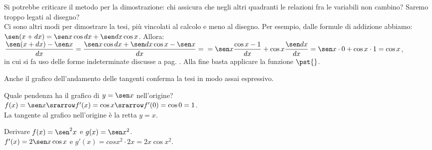 \begin{osservazione}
  Si potrebbe criticare il metodo per la dimostrazione: chi assicura che 
negli
  altri quadranti le relazioni fra le variabili non cambino? Saremo troppo
  legati al disegno?\\
  Ci sono altri modi per dimostrare la tesi, più vincolati al calcolo
  e meno al disegno.  Per esempio, dalle formule di addizione abbiamo:
  $\sen(x+dx)=\sen x \cos dx + \sen dx \cos x$. Allora:\\
  $\dfrac{\sen(x+dx)-\sen x}{dx}=\dfrac{\sen x \cos dx + \sen dx \cos x -
   \sen x}{dx}=\\
  =\sen x \dfrac{\cos x-1}{dx}+ \cos x\dfrac{\sen dx}{dx}=
  \sen x\cdot 0 + \cos x\cdot 1=\cos x$,\\
  in cui si fa uso delle forme indeterminate discusse a pag. 
  \pageref{subsubsec:insnum_fseno}. Alla fine basta applicare la funzione 
  $\pst{}$.
\end{osservazione}

\begin{osservazione}
Anche il grafico dell'andamento delle tangenti conferma la tesi
in modo assai espressivo. \\
\begin{inaccessibleblock}
  \begin{minipage}[]{.47\textwidth}
    \begin{center} \seno \end{center}
 \end{minipage} 
  \hfill
 \begin{minipage}[]{.47\textwidth}
 \begin{center} \tangentiseno \end{center}
 \end{minipage}
\end{inaccessibleblock}
\label{}
\end{osservazione}

\begin{esempio}
Quale pendenza ha il grafico di $y=\sen x$ nell'origine?\\
$f(x)= \sen x \srarrow f'(x)=\cos x\srarrow f'(0)=\cos 0=1$.\\
La tangente al grafico nell'origine è la retta $y=x$.
\end{esempio}

\begin{esempio}
Derivare $f(x)=\sen^2 x$ e $g(x)= \sen x^2$.\\
$f'(x)=2\sen x \cos x$ e $g'(x)=cos x^2\cdot 2x= 2x \cos x^2$.
\end{esempio}

